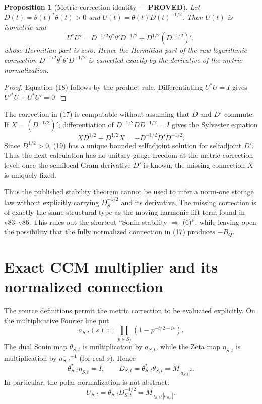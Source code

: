 \documentclass[11pt]{article}
\newtheorem{proposition}[theorem]{Proposition}
\newcommand{\PROVED}{\textcolor{green!45!black}{\textbf{PROVED}}}
\begin{document}
\begin{proposition}[Metric correction identity --- \PROVED]
Let $D(t)=\theta(t)^*\theta(t)>0$ and
$U(t)=\theta(t)D(t)^{-1/2}$.  Then $U(t)$ is isometric and
\begin{equation}
 U^*U'=D^{-1/2}\theta^*\theta'D^{-1/2}
       +D^{1/2}(D^{-1/2})',                              \tag{18}
\end{equation}
whose Hermitian part is zero.  Hence the Hermitian part of the raw logarithmic
connection $D^{-1/2}\theta^*\theta'D^{-1/2}$ is cancelled exactly by the
derivative of the metric normalization.
\end{proposition}

\begin{proof}
Equation (18) follows by the product rule.  Differentiating $U^*U=I$ gives
$U'^*U+U^*U'=0$.
\end{proof}

The correction in (17) is computable without assuming that $D$ and $D'$ commute.
If $X=(D^{-1/2})'$, differentiation of
$D^{-1/2}DD^{-1/2}=I$ gives the Sylvester equation
\begin{equation}
 XD^{1/2}+D^{1/2}X=-D^{-1/2}D'D^{-1/2}.                  \tag{19}
\end{equation}
Since $D^{1/2}>0$, (19) has a unique bounded selfadjoint solution for
selfadjoint $D'$.  Thus the next calculation has no unitary gauge freedom at
the metric-correction level: once the semilocal Gram derivative $D'$ is known,
the missing connection $X$ is uniquely fixed.

Thus the published stability theorem cannot be used to infer a norm-one
storage law without explicitly carrying $D_S^{-1/2}$ and its derivative.
The missing correction is of exactly the same structural type as the moving
harmonic-lift term found in v83--v86.  This rules out the shortcut
``Sonin stability $\Rightarrow$ (6)'', while leaving open the possibility that
the fully normalized connection in (17) produces $-B_Q$.

\section{Exact CCM multiplier and its normalized connection}

The source definitions permit the metric correction to be evaluated
explicitly.  On the multiplicative Fourier line put
\begin{equation}
 a_{S,t}(s):=\prod_{p\in S_f}
 \left(1-p^{-t/2-is}\right).                             \tag{20}
\end{equation}
The dual Sonin map $\theta_{S,t}$ is multiplication by $a_{S,t}$, while the
Zeta map $\eta_{S,t}$ is multiplication by
$\overline{a_{S,t}}^{-1}$ (for real $s$).  Hence
\begin{equation}
 \theta_{S,t}^*\eta_{S,t}=I,
 \qquad
 D_{S,t}=\theta_{S,t}^*\theta_{S,t}=M_{|a_{S,t}|^2}.     \tag{21}
\end{equation}
In particular, the polar normalization is not abstract:
\begin{equation}
 U_{S,t}=\theta_{S,t}D_{S,t}^{-1/2}
 =M_{a_{S,t}/|a_{S,t}|}.                                \tag{22}
\end{equation}
\end{document}
